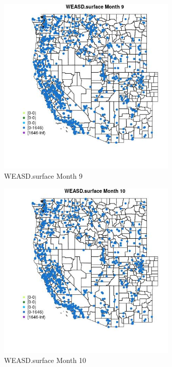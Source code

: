 \begin{figure} 
\centering  
\includegraphics[width=0.77\textwidth]{Code_Outputs/Report_ML_input_PM25_Step4_part_f_de_duplicated_aves_prioritize_24hr_obswNAs_MapObsMo9WEASDsurface.jpg} 
\caption{\label{fig:Report_ML_input_PM25_Step4_part_f_de_duplicated_aves_prioritize_24hr_obswNAsMapObsMo9WEASDsurface}WEASD.surface Month 9} 
\end{figure} 
 

\clearpage 

\begin{figure} 
\centering  
\includegraphics[width=0.77\textwidth]{Code_Outputs/Report_ML_input_PM25_Step4_part_f_de_duplicated_aves_prioritize_24hr_obswNAs_MapObsMo10WEASDsurface.jpg} 
\caption{\label{fig:Report_ML_input_PM25_Step4_part_f_de_duplicated_aves_prioritize_24hr_obswNAsMapObsMo10WEASDsurface}WEASD.surface Month 10} 
\end{figure} 
 

